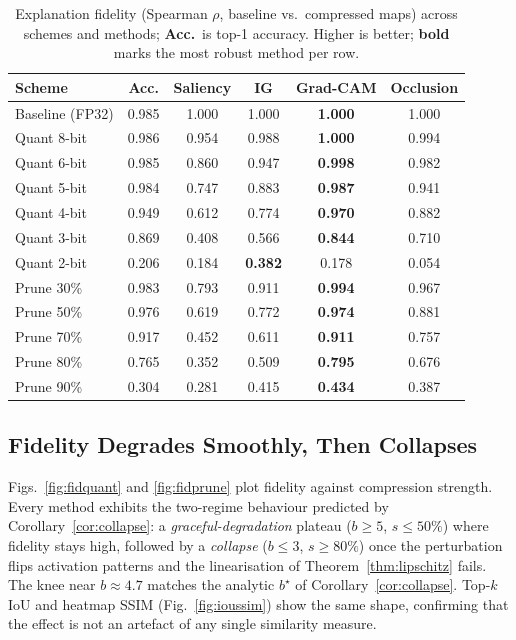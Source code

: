 \begin{table}[!t]
\caption{Explanation fidelity (Spearman $\rho$, baseline vs.\ compressed maps)
across schemes and methods; \textbf{Acc.}\ is top-1 accuracy. Higher is better;
\textbf{bold} marks the most robust method per row.}
\label{tab:main}
\centering
\begin{tabular}{l c c c c c}
\hline
\textbf{Scheme} & \textbf{Acc.} & \textbf{Saliency} & \textbf{IG} &
\textbf{Grad-CAM} & \textbf{Occlusion}\\
\hline
Baseline (FP32) & 0.985 & 1.000 & 1.000 & \textbf{1.000} & 1.000\\
\hline
Quant 8-bit & 0.986 & 0.954 & 0.988 & \textbf{1.000} & 0.994\\
Quant 6-bit & 0.985 & 0.860 & 0.947 & \textbf{0.998} & 0.982\\
Quant 5-bit & 0.984 & 0.747 & 0.883 & \textbf{0.987} & 0.941\\
Quant 4-bit & 0.949 & 0.612 & 0.774 & \textbf{0.970} & 0.882\\
Quant 3-bit & 0.869 & 0.408 & 0.566 & \textbf{0.844} & 0.710\\
Quant 2-bit & 0.206 & 0.184 & \textbf{0.382} & 0.178 & 0.054\\
\hline
Prune 30\% & 0.983 & 0.793 & 0.911 & \textbf{0.994} & 0.967\\
Prune 50\% & 0.976 & 0.619 & 0.772 & \textbf{0.974} & 0.881\\
Prune 70\% & 0.917 & 0.452 & 0.611 & \textbf{0.911} & 0.757\\
Prune 80\% & 0.765 & 0.352 & 0.509 & \textbf{0.795} & 0.676\\
Prune 90\% & 0.304 & 0.281 & 0.415 & \textbf{0.434} & 0.387\\
\hline
\end{tabular}
\end{table}

\subsection{Fidelity Degrades Smoothly, Then Collapses}
Figs.~\ref{fig:fidquant} and \ref{fig:fidprune} plot fidelity against
compression strength. Every method exhibits the two-regime behaviour predicted
by Corollary~\ref{cor:collapse}: a \emph{graceful-degradation} plateau
($b\ge5$, $s\le50\%$) where fidelity stays high, followed by a \emph{collapse}
($b\le3$, $s\ge80\%$) once the perturbation flips activation patterns and the
linearisation of Theorem~\ref{thm:lipschitz} fails. The knee near $b\approx4.7$
matches the analytic $b^\star$ of Corollary~\ref{cor:collapse}. Top-$k$ IoU and
heatmap SSIM (Fig.~\ref{fig:ioussim}) show the same shape, confirming that the
effect is not an artefact of any single similarity measure.


